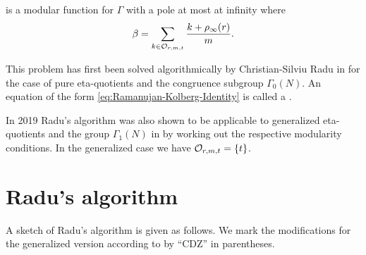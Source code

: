 \documentclass{article}
\begin{document}
is a modular function for $\Gamma$ with a pole at most at infinity where
\begin{gather}
  \beta = \sum_{k\in\mathcal{O}_{r,m,t}} \frac{k + \rho_\infty(r)}{m}.
  \label{eq:beta}
\end{gather}

This problem has first been solved algorithmically by Christian-Silviu
Radu in \cite{Radu_RamanujanKolberg_2015} for the case of pure
eta-quotients and the congruence subgroup $\Gamma_0(N)$.
%
An equation of the form \eqref{eq:Ramanujan-Kolberg-Identity} is
called a .

In 2019 Radu's algorithm was also shown to be applicable to generalized
eta-quotients and the group $\Gamma_1(N)$ in
\cite{ChenDuZhao_FindingModularFunctionsRamanujan_2019} by working out
the respective modularity conditions.
%
In the generalized case we have $\mathcal{O}_{r,m,t}=\left\{t\right\}$.



\section{Radu's algorithm}

A sketch of Radu's algorithm \cite{Radu_RamanujanKolberg_2015} is given as
follows. We mark the modifications for the generalized version
according to \cite{ChenDuZhao_FindingModularFunctionsRamanujan_2019}
by ``CDZ'' in parentheses.
\end{document}
